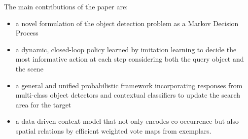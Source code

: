 The main contributions of the paper are:
\begin{itemize}
\item a novel formulation of the object detection problem as a Markov Decision Process 
\item a dynamic, closed-loop policy learned by imitation learning to decide the most informative action at each step considering both the query object and the scene 
\item a general and unified probabilistic framework incorporating responses from multi-class object detectors and contextual classifiers to update the search area for the target
\item a data-driven context model that not only encodes co-occurrence but also spatial relations by efficient weighted vote maps from exemplars.
\end{itemize}
